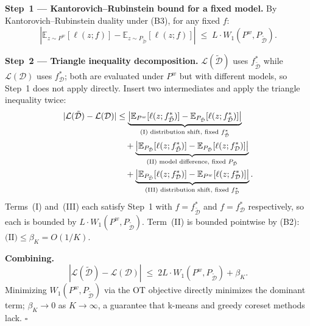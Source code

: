 \textbf{Step~1 --- Kantorovich--Rubinstein bound for a fixed model.}
By Kantorovich--Rubinstein duality \cite{villani2009optimal} under (B3), for any fixed $f$:
\begin{equation}
    \left|
        \mathbb{E}_{z \sim P^w}[\ell(z; f)]
        - \mathbb{E}_{z \sim P_{\tilde{\mathcal{D}}}}[\ell(z; f)]
    \right|
    \;\leq\; L \cdot W_1(P^w, P_{\tilde{\mathcal{D}}}).
\end{equation}

\textbf{Step~2 --- Triangle inequality decomposition.}
$\mathcal{L}(\tilde{\mathcal{D}})$ uses $f^*_{\tilde{\mathcal{D}}}$ while $\mathcal{L}(\mathcal{D})$ uses $f^*_\mathcal{D}$; both are evaluated under $P^w$ but with different models, so Step~1 does not apply directly.
Insert two intermediates and apply the triangle inequality twice:
\begin{align}
    |\mathcal{L}(\tilde{\mathcal{D}}) - \mathcal{L}(\mathcal{D})|
    &\leq
    \underbrace{
        \left|
            \mathbb{E}_{P^w}[\ell(z;f^*_{\tilde{\mathcal{D}}})]
            - \mathbb{E}_{P_{\tilde{\mathcal{D}}}}[\ell(z;f^*_{\tilde{\mathcal{D}}})]
        \right|
    }_{\text{(I) distribution shift, fixed }f^*_{\tilde{\mathcal{D}}}} \notag \\
    &\quad +
    \underbrace{
        \left|
            \mathbb{E}_{P_{\tilde{\mathcal{D}}}}[\ell(z;f^*_{\tilde{\mathcal{D}}})]
            - \mathbb{E}_{P_{\tilde{\mathcal{D}}}}[\ell(z;f^*_\mathcal{D})]
        \right|
    }_{\text{(II) model difference, fixed }P_{\tilde{\mathcal{D}}}} \notag \\
    &\quad +
    \underbrace{
        \left|
            \mathbb{E}_{P_{\tilde{\mathcal{D}}}}[\ell(z;f^*_\mathcal{D})]
            - \mathbb{E}_{P^w}[\ell(z;f^*_\mathcal{D})]
        \right|
    }_{\text{(III) distribution shift, fixed }f^*_\mathcal{D}}.
\end{align}
Terms~(I) and~(III) each satisfy Step~1 with $f = f^*_{\tilde{\mathcal{D}}}$ and $f = f^*_\mathcal{D}$ respectively, so each is bounded by $L \cdot W_1(P^w, P_{\tilde{\mathcal{D}}})$.
Term~(II) is bounded pointwise by (B2): $\text{(II)} \leq \beta_K = O(1/K)$.

\textbf{Combining.}
\begin{equation}
    |\mathcal{L}(\tilde{\mathcal{D}}) - \mathcal{L}(\mathcal{D})|
    \;\leq\; 2L \cdot W_1(P^w, P_{\tilde{\mathcal{D}}}) + \beta_K.
\end{equation}
Minimizing $W_1(P^w, P_{\tilde{\mathcal{D}}})$ via the OT objective directly minimizes the dominant term; $\beta_K \to 0$ as $K \to \infty$, a guarantee that k-means and greedy coreset methods lack. $\square$

